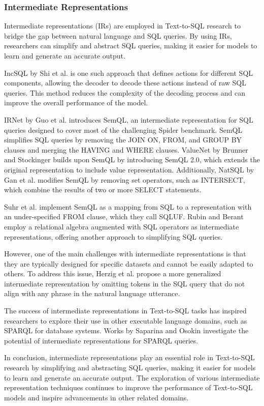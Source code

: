 \subsubsection{Intermediate Representations}

Intermediate representations (IRs) are employed in Text-to-SQL research to bridge the gap between natural language and SQL queries. By using IRs, researchers can simplify and abstract SQL queries, making it easier for models to learn and generate an accurate output.

IncSQL by Shi et al. \cite{shi2018incsql} is one such approach that defines actions for different SQL components, allowing the decoder to decode these actions instead of raw SQL queries. This method reduces the complexity of the decoding process and can improve the overall performance of the model.

IRNet by Guo et al. \cite{DBLP:journals/corr/abs-1905-08205} introduces SemQL, an intermediate representation for SQL queries designed to cover most of the challenging Spider benchmark. SemQL simplifies SQL queries by removing the JOIN ON, FROM, and GROUP BY clauses and merging the HAVING and WHERE clauses. ValueNet by Brunner and Stockinger \cite{brunner2021valuenet} builds upon SemQL by introducing SemQL 2.0, which extends the original representation to include value representation. Additionally, NatSQL by Gan et al. \cite{gan-etal-2021-natural-sql} modifies SemQL by removing set operators, such as INTERSECT, which combine the results of two or more SELECT statements.

Suhr et al. \cite{semql} implement SemQL as a mapping from SQL to a representation with an under-specified FROM clause, which they call SQLUF. Rubin and Berant employ a relational algebra augmented with SQL operators as intermediate representations, offering another approach to simplifying SQL queries.

However, one of the main challenges with intermediate representations is that they are typically designed for specific datasets and cannot be easily adapted to others. To address this issue, Herzig et al. \cite{herzig2021unlocking} propose a more generalized intermediate representation by omitting tokens in the SQL query that do not align with any phrase in the natural language utterance.

The success of intermediate representations in Text-to-SQL tasks has inspired researchers to explore their use in other executable language domains, such as SPARQL for database systems. Works by Saparina and Osokin \cite{saparina-osokin-2021-sparqling} investigate the potential of intermediate representations for SPARQL queries.

In conclusion, intermediate representations play an essential role in Text-to-SQL research by simplifying and abstracting SQL queries, making it easier for models to learn and generate an accurate output. The exploration of various intermediate representation techniques continues to improve the performance of Text-to-SQL models and inspire advancements in other related domains.